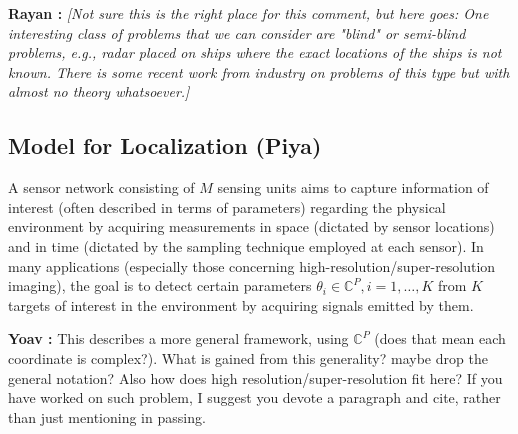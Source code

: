 \documentclass{article}
\newcommand{\comment}[3]{{\color{#1} {\bf #2 :} #3}}
\newcommand{\yoav}[1]{\comment{magenta}{Yoav}{#1}}
\newcommand{\rayan}[1]{\comment{red}{Rayan}{#1}}
\begin{document}
\rayan{\em [Not sure this is the right place for this comment, but here goes: One interesting class of problems that we can consider are "blind" or semi-blind problems, e.g., radar placed on ships where the exact locations of the ships is not known. There is some recent work from industry on problems of this type but with almost no theory whatsoever.]}

\subsection{Model for Localization (Piya)} A sensor network consisting of $M$ sensing units aims to capture information of interest (often described in terms of parameters) regarding the physical environment by acquiring measurements in space (dictated by sensor locations) and in time (dictated by the sampling technique employed at each sensor). In many applications (especially those concerning high-resolution/super-resolution imaging), the goal is to detect certain parameters $\theta_i\in\mathbb{C}^P, i=1,\ldots,K$ from $K$ targets of interest in the environment by acquiring signals emitted by them. 

\yoav{This describes a more general framework, using $\mathbb{C}^P$ (does that mean each coordinate is complex?). What is gained from this generality? maybe drop the general notation? Also how does high resolution/super-resolution fit here? If you have worked on such problem, I suggest you devote a paragraph and cite, rather than just mentioning in passing.} 
\end{document}
